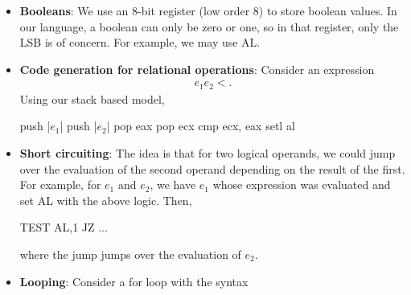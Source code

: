 \documentclass{report}
\begin{document}
\begin{itemize}
            \bigbreak \noindent 
            \begin{cppcode}
                MOV    RSI, &data
                MOV    [ESI], EAX
            \end{cppcode}
            \bigbreak \noindent 
            The first MOV uses 
            \bigbreak \noindent 
            \begin{cppcode}
               REX.W + B8+ rd io MOV r64, imm64 
            \end{cppcode}
            \bigbreak \noindent 
            The second MOV uses
            \bigbreak \noindent 
            \begin{cppcode}
            89 /r MOV r/m32, r32
            \end{cppcode}
            \bigbreak \noindent 
            and the encoding is 8906.
        \item \textbf{Booleans}: We use an 8-bit register (low order 8) to store boolean values. In our language, a boolean can only be zero or one, so in that register, only the LSB is of concern. For example, we may use AL.
        \item \textbf{Code generation for relational operations}: Consider an expression
            \begin{align*}
                e_{1}e_{2}<
            .\end{align*}
            Using our stack based model,
            \begin{cppcode}
            push   |$e_{1}$|
            push   |$e_{2}$|
            pop    eax
            pop    ecx
            cmp    ecx, eax
            setl   al
            \end{cppcode}
        \item \textbf{Short circuiting}: The idea is that for two logical operands, we could jump over the evaluation of the second operand depending on the result of the first. For example, for $e_{1} \text{ and } e_{2}$, we have $e_{1}$ whose expression was evaluated and set AL with the above logic. Then,
            \bigbreak \noindent 
            \begin{cppcode}
                TEST AL,1    
                JZ ...
            \end{cppcode}
            \bigbreak \noindent 
            where the jump jumps over the evaluation of $e_{2}$.
        \item \textbf{Looping}: Consider a for loop with the syntax
            \bigbreak \noindent 
            \begin{cppcode}

\end{cppcode}
\end{itemize}
\end{document}
